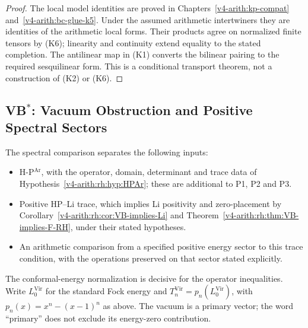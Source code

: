 \begin{proof}
The local model identities are proved in
Chapters~\ref{v4-arith:kp-compat} and~\ref{v4-arith:bc-glue-k5}.
Under the assumed arithmetic intertwiners they are identities of
the arithmetic local forms. Their products agree on normalized
finite tensors by (K6); linearity and continuity extend equality
to the stated completion. The antilinear map in (K1) converts the
bilinear pairing to the required sesquilinear form. This is a
conditional transport theorem, not a construction of (K2) or (K6).
\end{proof}

\subsection{\texorpdfstring{VB\(^{*}\)}{VB*}: Vacuum Obstruction and Positive Spectral Sectors}

The spectral comparison separates the following inputs:
\begin{itemize}
\item H-P\(^{\mathrm{Ar}}\), with the operator, domain, determinant
and trace data of Hypothesis~\ref{v4-arith:rh:hyp:HPAr}; these are additional
to P1, P2 and P3.
\item Positive HP--Li trace, which implies Li positivity and
zero-placement by Corollary~\ref{v4-arith:rh:cor:VB-implies-Li} and
Theorem~\ref{v4-arith:rh:thm:VB-implies-F-RH}, under their stated hypotheses.
\item An arithmetic comparison from a specified positive energy
sector to this trace condition, with the operations preserved on that
sector stated explicitly.
\end{itemize}

The conformal-energy normalization is decisive for the operator
inequalities. Write \(L_0^{\mathrm{Vir}}\) for the standard Fock
energy and \(T_n^{\mathrm{Vir}}=p_n(L_0^{\mathrm{Vir}})\), with
\(p_n(x)=x^n-(x-1)^n\) as above. The vacuum is a primary vector;
the word ``primary'' does not exclude its energy-zero contribution.


